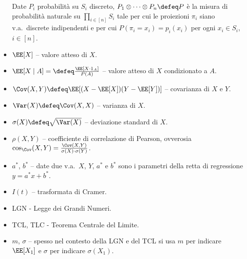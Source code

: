 \begin{multicols*}{2}
\begin{itemize}
        Date $P_i$ probabilità su $S_i$ discreto, $P_1 \otimes \cdots \otimes P_n \defeq P$ è la misura di probabilità naturale su $\prod_{i \in [n]} S_i$ tale per cui
        le proiezioni $\pi_i$ siano v.a.~discrete indipendenti e per cui
        $P(\pi_i = x_i) = p_i(x_i)$ per ogni $x_i \in S_i$, $i \in [n]$.
        \item $\EE[X]$ -- valore atteso di $X$.
        \item $\EE[X \mid A] = \defeq \frac{\EE[X \cdot 1_A]}{P(A)}$ -- valore atteso di $X$
        condizionato a $A$.
        \item $\Cov(X, Y) \defeq \EE[(X - \EE[X])(Y - \EE[Y])]$ -- covarianza di $X$ e $Y$.
        \item $\Var(X) \defeq \Cov(X, X)$ -- varianza di $X$.
        \item $\sigma(X) \defeq \sqrt{\Var(X)}$ -- deviazione standard di $X$.
        \item $\rho(X, Y)$ -- coefficiente
        di correlazione di Pearson, ovverosia
        $\cos_{\Cov}(X, Y) = \frac{\Cov(X, Y)}{\sigma(X) \cdot \sigma(Y)}$.
        \item $a^*$, $b^*$ -- date due
        v.a.~$X$, $Y$, $a^*$ e $b^*$ sono
        i parametri della retta di
        regressione $y = a^*x + b^*$.
        \item $I(t)$ -- trasformata di Cramer.
        \item LGN - Legge dei Grandi Numeri.
        \item TCL, TLC - Teorema Centrale del Limite.
        \item $m$, $\sigma$ -- spesso nel contesto
        della LGN e del TCL si usa $m$ per
        indicare $\EE[X_1]$ e $\sigma$ per
        indicare $\sigma(X_1)$.
    \end{itemize}
\end{multicols*}
